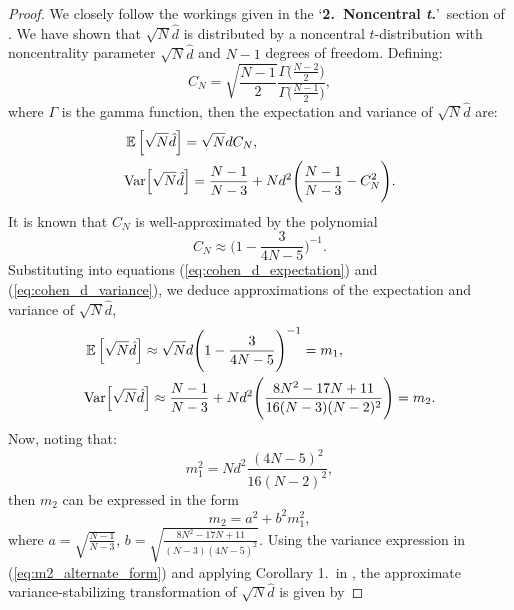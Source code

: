 \begin{proof}
We closely follow the workings given in the `\textbf{2.\ Noncentral \textit{t}.}'\ section of \citet*{Laubscher1960-px}. We have shown that $\sqrt{N}\hat{d}$ is distributed by a noncentral $t$-distribution with noncentrality parameter $\sqrt{N}{\hat{d}}$ and $N - 1$ degrees of freedom. Defining:
\begin{equation}
\label{eq:Cn}
C_{N} = \sqrt{\frac{N-1}{2}} \frac{\Gamma\Big(\frac{N-2}{2}\Big)}{\Gamma\Big(\frac{N-1}{2}\Big)},
\end{equation}
where $\Gamma$ is the gamma function, then the expectation and variance of $\sqrt{N}\hat{d}$ are:
\begin{align}
& \operatorname*{\mathbb{E}}\Big[\sqrt{N}\hat{d}\Big] = \sqrt{N}dC_{N}, \label{eq:cohen_d_expectation}\\
& \mathrm{Var}\Big[\sqrt{N}\hat{d}\Big] =  \frac{N-1}{N-3} + Nd^{2} \Bigg(\frac{N-1}{N-3} - C_{N}^{2} \Bigg). \label{eq:cohen_d_variance}
\end{align}
It is known that $C_{N}$ is well-approximated by the polynomial
\begin{equation}
\label{eq:Cn_approximation}
C_{N} \approx \Bigg(1 - \frac{3}{4N - 5} \Bigg)^{-1}.
\end{equation}
Substituting into equations (\ref{eq:cohen_d_expectation}) and (\ref{eq:cohen_d_variance}), we deduce approximations of the expectation and variance of $\sqrt{N}\hat{d}$, 
\begin{align}
&  \operatorname*{\mathbb{E}}\Big[\sqrt{N}\hat{d}\Big] \approx \sqrt{N}d \Bigg(1 - \frac{3}{4N - 5}\Bigg)^{-1} = m_{1}, \label{eq:cohen_d_expectation_approximation}\\
& \mathrm{Var}\Big[\sqrt{N}\hat{d}\Big] \approx  \frac{N-1}{N-3} + N d^{2} \Bigg(\frac{8N^{2} - 17N + 11}{16(N-3)(N-2)^{2}} \Bigg) =  m_{2}. \label{eq:cohen_d_variance_approximation}
\end{align}
Now, noting that: 
\begin{equation}
\label{eq:m1_squared}
m_{1}^{2} = N d^{2} \frac{(4N -5)^{2}}{16(N-2)^{2}},
\end{equation}
then $m_{2}$ can be expressed in the form
\begin{equation}
\label{eq:m2_alternate_form}
m_{2} = a^{2} + b^{2} m_{1}^{2},
\end{equation}
where $a = \sqrt{\frac{N-1}{N-3}}$, $b = \sqrt{\frac{8N^{2}-17N + 11}{(N-3)(4N-5)^{2}}}$.
Using the variance expression in (\ref{eq:m2_alternate_form}) and applying Corollary 1.\  in \citeauthor{Laubscher1960-px}, the approximate variance-stabilizing transformation of $\sqrt{N}\hat{d}$ is given by 

\end{proof}
